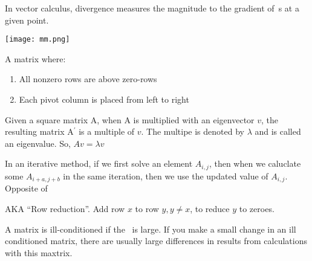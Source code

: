 \begin{definition}[Divergence]
    In vector calculus, divergence measures the magnitude to the
    gradient of~s at a given point.

\end{definition}

\begin{definition}
    \texttt{[image: mm.png]}
\end{definition}

\begin{definition}
    A matrix where:
    \begin{enumerate}
        \item All nonzero rows are above zero-rows
        \item Each pivot column is placed from left to right
    \end{enumerate}
\end{definition}

\begin{definition}[Eigenvector]\label{eigen}
    Given a square matrix A, when A is multiplied with an eigenvector $v$,
    the resulting matrix A${^\prime}$ is a multiple of $v$.
    The multipe is denoted by $\lambda$ and is called an eigenvalue.
    So, $Av = \lambda v$

\end{definition}

\begin{definition}\label{forwardsubstituion}
    In an iterative method, if we first solve an element $A_{i,j}$,
    then when we caluclate some $A_{i+a, j+b}$ in the same iteration, then we
    use the updated value of $A_{i,j}$. Opposite
    of~

\end{definition}

\begin{definition}
    AKA ``Row reduction''. Add row $x$ to row $y, y \neq x$, to reduce $y$ to 
    zeroes.

\end{definition}

\begin{definition}
    A matrix is ill-conditioned if the~ is large.
    If you make a small change in an ill conditioned matrix, there are usually
    large differences in results from calculations with this maxtrix.

\end{definition}

